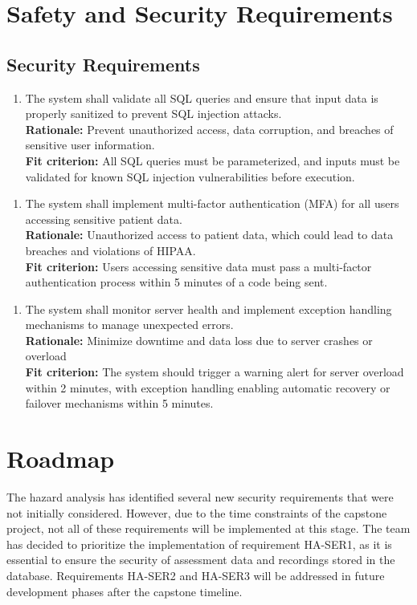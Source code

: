 \documentclass{article}
\begin{document}
\section{Safety and Security Requirements}
\subsection{Security Requirements}
\begin{enumerate}[{HA-SER}1. ]
    \item The system shall validate all SQL queries and ensure that input data is properly sanitized to prevent SQL injection attacks.\\
    \textbf{Rationale: }Prevent unauthorized access, data corruption, and breaches of sensitive user information.\\
    \textbf{Fit criterion: }All SQL queries must be parameterized, and inputs must be validated for known SQL injection vulnerabilities before execution.\\ 
  \end{enumerate}
\begin{enumerate}[{HA-SER}2. ]
    \item The system shall implement multi-factor authentication (MFA) for all users accessing sensitive patient data.\\
    \textbf{Rationale: }Unauthorized access to patient data, which could lead to data breaches and violations of HIPAA.\\
    \textbf{Fit criterion: }Users accessing sensitive data must pass a multi-factor authentication process within 5 minutes of a code being sent.\\
  \end{enumerate}
\begin{enumerate}[{HA-SER}3. ]
    \item The system shall monitor server health and implement exception handling mechanisms to manage unexpected errors.\\
    \textbf{Rationale: }Minimize downtime and data loss due to server crashes or overload\\
    \textbf{Fit criterion: }The system should trigger a warning alert for server overload within 2 minutes, with exception handling enabling automatic recovery or failover mechanisms within 5 minutes.\\
  \end{enumerate}
\section{Roadmap}
\hspace{1.5em} The hazard analysis has identified several new security requirements that were 
not initially considered. However, due to the time constraints of the capstone 
project, not all of these requirements will be implemented at this stage. The 
team has decided to prioritize the implementation of requirement HA-SER1, as it
is essential to ensure the security of assessment data and recordings stored in the database. Requirements HA-SER2 and
HA-SER3 will be addressed in future development phases after the capstone timeline.
\newpage
\end{document}
